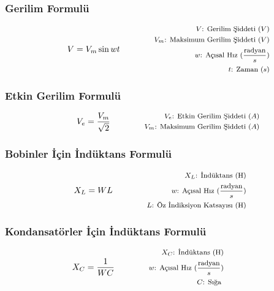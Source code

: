 \subsubsection*{Gerilim Formulü}
\begin{equation}
    V = V_{m} \sin{wt} \qquad \qquad \parbox{4cm}{\footnotesize$\begin{aligned}
        V\text{: Gerilim Şiddeti } (V) \\
        V_m\text{: Maksimum Gerilim Şiddeti } (V) \\
        w\text{: Açısal Hız } (\frac{\text{radyan}}{s}) \\
        t\text{: Zaman } (s)
\end{aligned}$}
\end{equation}

\subsubsection*{Etkin Gerilim Formulü}
\begin{equation}
    V_e = \frac{V_{m}}{\sqrt 2} \qquad \qquad \parbox{4cm}{\footnotesize$\begin{aligned}
        V_e\text{: Etkin Gerilim Şiddeti } (A) \\
        V_m\text{: Maksimum Gerilim Şiddeti } (A)
\end{aligned}$}
\end{equation}

\subsubsection*{Bobinler İçin İndüktans Formulü}
\begin{equation}
    X_L = WL \qquad \qquad \parbox{4cm}{\footnotesize$\begin{aligned}
        X_L\text{: İndüktans (H)} \\
        w\text{: Açısal Hız } (\frac{\text{radyan}}{s}) \\
        L\text{: Öz İndiksiyon Katsayısı (H)}
\end{aligned}$}
\end{equation}

\subsubsection*{Kondansatörler İçin İndüktans Formulü}
\begin{equation}
    X_C = \frac{1}{WC} \qquad \qquad \parbox{4cm}{\footnotesize$\begin{aligned}
        X_C\text{: İndüktans (H)} \\
        w\text{: Açısal Hız } (\frac{\text{radyan}}{s}) \\
        C\text{: Sığa }
\end{aligned}$}
\end{equation}

